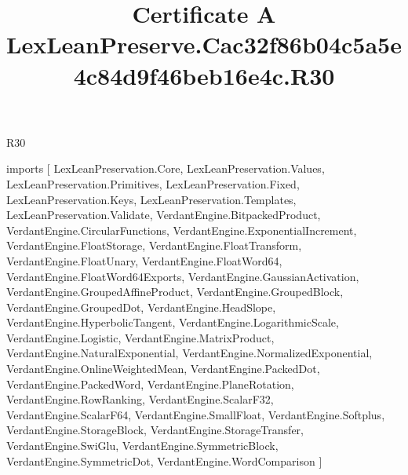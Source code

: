 \begin{lexlean}{R30}
\title{Certificate A LexLeanPreserve.Cac32f86b04c5a5e4c84d9f46beb16e4c.R30}
\begin{coremodule}
imports [
  LexLeanPreservation.Core,
  LexLeanPreservation.Values,
  LexLeanPreservation.Primitives,
  LexLeanPreservation.Fixed,
  LexLeanPreservation.Keys,
  LexLeanPreservation.Templates,
  LexLeanPreservation.Validate,
  VerdantEngine.BitpackedProduct,
  VerdantEngine.CircularFunctions,
  VerdantEngine.ExponentialIncrement,
  VerdantEngine.FloatStorage,
  VerdantEngine.FloatTransform,
  VerdantEngine.FloatUnary,
  VerdantEngine.FloatWord64,
  VerdantEngine.FloatWord64Exports,
  VerdantEngine.GaussianActivation,
  VerdantEngine.GroupedAffineProduct,
  VerdantEngine.GroupedBlock,
  VerdantEngine.GroupedDot,
  VerdantEngine.HeadSlope,
  VerdantEngine.HyperbolicTangent,
  VerdantEngine.LogarithmicScale,
  VerdantEngine.Logistic,
  VerdantEngine.MatrixProduct,
  VerdantEngine.NaturalExponential,
  VerdantEngine.NormalizedExponential,
  VerdantEngine.OnlineWeightedMean,
  VerdantEngine.PackedDot,
  VerdantEngine.PackedWord,
  VerdantEngine.PlaneRotation,
  VerdantEngine.RowRanking,
  VerdantEngine.ScalarF32,
  VerdantEngine.ScalarF64,
  VerdantEngine.SmallFloat,
  VerdantEngine.Softplus,
  VerdantEngine.StorageBlock,
  VerdantEngine.StorageTransfer,
  VerdantEngine.SwiGlu,
  VerdantEngine.SymmetricBlock,
  VerdantEngine.SymmetricDot,
  VerdantEngine.WordComparison
]


\end{coremodule}
\end{lexlean}
